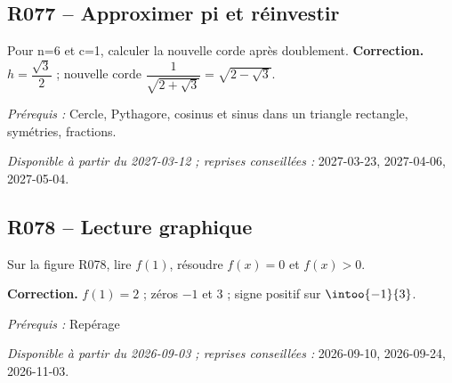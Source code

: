 \subsection*{R077 -- Approximer pi et réinvestir}\label{R077}
Pour n=6 et c=1, calculer la nouvelle corde après doublement.
\ifmxteacher\textbf{Correction.} $h=\dfrac{\sqrt 3}{2}$ ; nouvelle corde $\dfrac{1}{\sqrt {2+\sqrt3}}=\sqrt {2-\sqrt3}$.\par\textit{Prérequis :} Cercle, Pythagore, cosinus et sinus dans un triangle rectangle, symétries, fractions.\par\textit{Disponible à partir du 2027-03-12 ; reprises conseillées :} 2027-03-23, 2027-04-06, 2027-05-04.\fi
{}
\subsection*{R078 -- Lecture graphique}\label{R078}
Sur la figure R078, lire $f(1)$, résoudre $f(x)=0$ et $f(x)>0$.
\begin{center}\end{center}\ifmxteacher\textbf{Correction.} $f(1)=2$ ; zéros $-1$ et 3 ; signe positif sur $\intoo{-1}{3}$.\par\textit{Prérequis :} Repérage\par\textit{Disponible à partir du 2026-09-03 ; reprises conseillées :} 2026-09-10, 2026-09-24, 2026-11-03.\fi
